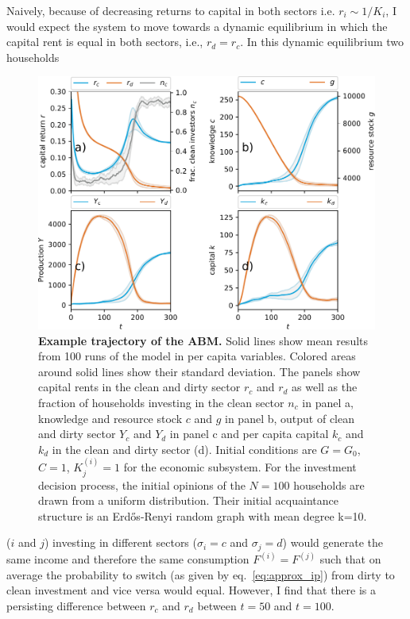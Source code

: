 Naively, because of decreasing returns to capital in both sectors i.e. $r_i \sim 1/K_i$, I would expect the system to move towards a dynamic equilibrium in which the capital rent is equal in both sectors, i.e., $r_d = r_c$. In this dynamic equilibrium two households
\begin{figure}[H]
  \hspace{-1.3 cm}\includegraphics[width=1.2\linewidth]{figures/example_trajectory_square_thesis.pdf}
  \caption{\textbf{Example trajectory of the ABM.} Solid lines show mean results from 100 runs of the model in per capita variables. Colored areas around solid lines show their standard deviation. The panels show capital rents in the clean and dirty sector $r_c$ and $r_d$ as well as the fraction of households investing in the clean sector $n_c$ in panel a, knowledge and resource stock $c$ and $g$ in panel b, output of clean and dirty sector $Y_c$ and $Y_d$ in panel c and per capita capital $k_c$ and $k_d$ in the clean and dirty sector (d).
Initial conditions are $G=G_0$, $C=1$, $K_j^{(i)}=1$ for the economic subsystem. For the investment decision process, the initial opinions of the $N=100$ households are drawn from a uniform distribution. Their initial acquaintance structure is an Erd\H{o}s-Renyi random graph with mean degree k=10.}
\label{fig:example_trajectory}
\end{figure}
($i$ and $j$) investing in different sectors ($\sigma_i=c$ and $\sigma_j=d$) would generate the same income and therefore the same consumption $F^{(i)}=F^{(j)}$ such that on average the probability to switch (as given by eq.~\eqref{eq:approx_ip}) from dirty to clean investment and vice versa would equal. However, I find that there is a persisting difference between $r_c$ and $r_d$ between $t=50$ and $t=100$.
